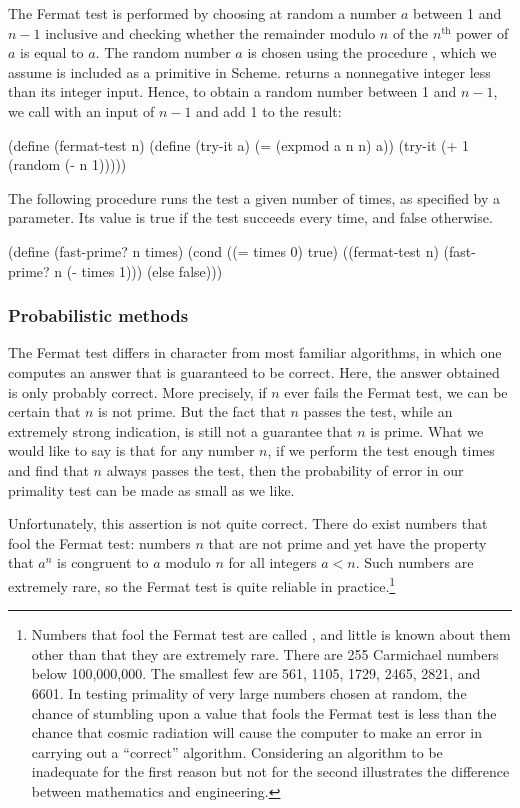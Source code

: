 The Fermat test is performed by choosing at random a number \( a \) between 1 and
\( n-1 \) inclusive and checking whether the remainder modulo \( n \) of the
\( n^{\mathrm{th}} \) power of \( a \) is equal to \( a \).  The random number \( a \) is chosen
using the procedure , which we assume is included as a primitive
in Scheme.  returns a nonnegative integer less than its integer
input.  Hence, to obtain a random number between 1 and \( n-1 \), we call
 with an input of \( n-1 \) and add 1 to the result:

\begin{codeBlock}
(define (fermat-test n)
  (define (try-it a)
    (= (expmod a n n) a))
  (try-it (+ 1 (random (- n 1)))))
\end{codeBlock}

\noindent
The following procedure runs the test a given number of times, as specified by
a parameter.  Its value is true if the test succeeds every time, and false
otherwise.

\begin{codeBlock}
(define (fast-prime? n times)
  (cond ((= times 0) true)
        ((fermat-test n) (fast-prime? n (- times 1)))
        (else false)))
\end{codeBlock}

\subsubsection*{Probabilistic methods}

The Fermat test differs in character from most familiar algorithms, in which
one computes an answer that is guaranteed to be correct.  Here, the answer
obtained is only probably correct.  More precisely, if \( n \) ever fails the
Fermat test, we can be certain that \( n \) is not prime.  But the fact that
\( n \) passes the test, while an extremely strong indication, is still not a
guarantee that \( n \) is prime.  What we would like to say is that for any
number \( n \), if we perform the test enough times and find that \( n \) always
passes the test, then the probability of error in our primality test can be
made as small as we like.

Unfortunately, this assertion is not quite correct.  There do exist numbers
that fool the Fermat test: numbers \( n \) that are not prime and yet have the
property that \( a^n \) is congruent to \( a \) modulo \( n \) for all integers
\( a < n \).  Such numbers are extremely rare, so the Fermat test is quite
reliable in practice.\footnote{\label{Footnote 1.47} Numbers
that fool the Fermat test are called , and little
is known about them other than that they are extremely rare.  There are 255
Carmichael numbers below 100,000,000.  The smallest few are 561, 1105, 1729,
2465, 2821, and 6601.  In testing primality of very large numbers chosen at
random, the chance of stumbling upon a value that fools the Fermat test is less
than the chance that cosmic radiation will cause the computer to make an error
in carrying out a ``correct'' algorithm.  Considering an algorithm to be
inadequate for the first reason but not for the second illustrates the
difference between mathematics and engineering.}

